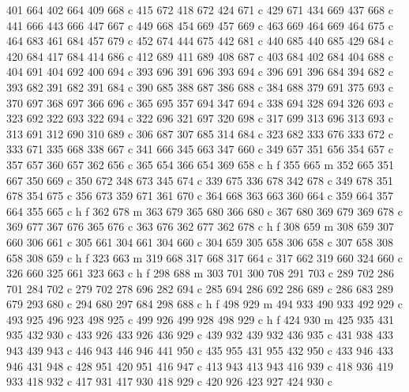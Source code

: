 {{        401 664 402 664 409 668 c
        415 672 418 672 424 671 c
        429 671 434 669 437 668 c
        441 666 443 666 447 667 c
        449 668 454 669 457 669 c
        463 669 464 669 464 675 c
        464 683 461 684 457 679 c
        452 674 444 675 442 681 c
        440 685 440 685 429 684 c
        420 684 417 684 414 686 c
        412 689 411 689 408 687 c
        403 684 402 684 404 688 c
        404 691 404 692 400 694 c
        393 696 391 696 393 694 c
        396 691 396 684 394 682 c
        393 682 391 682 391 684 c
        390 685 388 687 386 688 c
        384 688 379 691 375 693 c
        370 697 368 697 366 696 c
        365 695 357 694 347 694 c
        338 694 328 694 326 693 c
        323 692 322 693 322 694 c
        322 696 321 697 320 698 c
        317 699 313 696 313 693 c
        313 691 312 690 310 689 c
        306 687 307 685 314 684 c
        323 682 333 676 333 672 c
        333 671 335 668 338 667 c
        341 666 345 663 347 660 c
        349 657 351 656 354 657 c
        357 657 360 657 362 656 c
        365 654 366 654 369 658 c
        h f
        355 665 m
        352 665 351 667 350 669 c
        350 672 348 673 345 674 c
        339 675 336 678 342 678 c
        349 678 351 678 354 675 c
        356 673 359 671 361 670 c
        364 668 363 663 360 664 c
        359 664 357 664 355 665 c
        h f
        362 678 m
        363 679 365 680 366 680 c
        367 680 369 679 369 678 c
        369 677 367 676 365 676 c
        363 676 362 677 362 678 c
        h f
        308 659 m
        308 659 307 660 306 661 c
        305 661 304 661 304 660 c
        304 659 305 658 306 658 c
        307 658 308 658 308 659 c
        h f
        323 663 m
        319 668 317 668 317 664 c
        317 662 319 660 324 660 c
        326 660 325 661 323 663 c
        h f
        298 688 m
        303 701 300 708 291 703 c
        289 702 286 701 284 702 c
        279 702 278 696 282 694 c
        285 694 286 692 286 689 c
        286 683 289 679 293 680 c
        294 680 297 684 298 688 c
        h f
        498 929 m
        494 933 490 933 492 929 c
        493 925 496 923 498 925 c
        499 926 499 928 498 929 c
        h f
        424 930 m
        425 935 431 935 432 930 c
        433 926 433 926 436 929 c
        439 932 439 932 436 935 c
        431 938 433 943 439 943 c
        446 943 446 946 441 950 c
        435 955 431 955 432 950 c
        433 946 433 946 431 948 c
        428 951 420 951 416 947 c
        413 943 413 943 416 939 c
        418 936 419 933 418 932 c
        417 931 417 930 418 929 c
        420 926 423 927 424 930 c
}}
